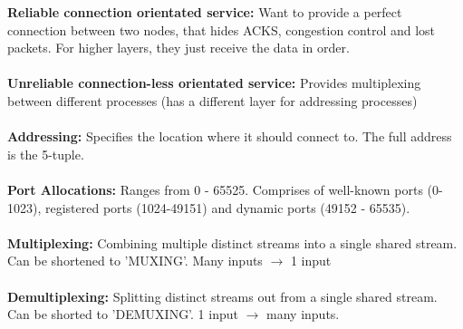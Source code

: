 \documentclass[a4paper,10pt]{article}
\begin{document}
\textcolor{PineGreen}{\textbf{Reliable connection orientated service:}} Want to provide a perfect connection between two nodes, that hides ACKS, congestion control and lost packets. For higher layers, they just receive the data in order. \\\\
\textcolor{PineGreen}{\textbf{Unreliable connection-less orientated service:}} Provides multiplexing between different processes (has a different layer for addressing processes) \\\\
\textcolor{PineGreen}{\textbf{Addressing:}} Specifies the location where it should connect to. The full address is the 5-tuple. \\\\
\textcolor{PineGreen}{\textbf{Port Allocations:}} Ranges from 0 - 65525. Comprises of well-known ports (0-1023), registered ports (1024-49151) and dynamic ports (49152 - 65535). \\\\
\textcolor{PineGreen}{\textbf{Multiplexing:}} Combining multiple distinct streams into a single shared stream. Can be shortened to 'MUXING'. Many inputs $\rightarrow$ 1 input\\\\
\textcolor{PineGreen}{\textbf{Demultiplexing:}} Splitting distinct streams out from a single shared stream. Can be shorted to 'DEMUXING'. 1 input $\rightarrow$ many inputs. 
\end{document}
